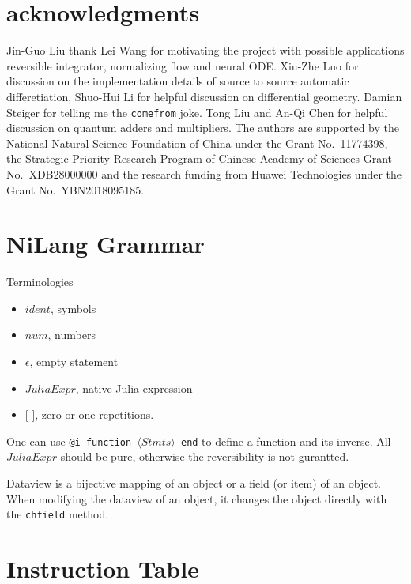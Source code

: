 \documentclass[aps,twocolumn,longbibliography,english,superscriptaddress]{revtex4-1}
\newcommand{\<}{\langle}
\renewcommand{\>}{\rangle}
\theoremstyle{definition}\newtheorem{definition}{\textit{Definition}}
\begin{document}
\section{acknowledgments}
Jin-Guo Liu thank Lei Wang for motivating the project with possible applications reversible integrator, normalizing flow and neural ODE.
Xiu-Zhe Luo for discussion on the implementation details of source to source automatic differetiation,
Shuo-Hui Li for helpful discussion on differential geometry.
Damian Steiger for telling me the \texttt{comefrom} joke.
Tong Liu and An-Qi Chen for helpful discussion on quantum adders and multipliers.
The authors are supported by the National Natural Science Foundation of China under the Grant No.~11774398, the Strategic Priority Research Program of Chinese Academy of Sciences Grant No.~XDB28000000 and the research funding from Huawei Technologies under the Grant No.~YBN2018095185.




\pagebreak
\appendix

\section{NiLang Grammar}\label{app:grammar}

Terminologies
\begin{itemize}
    \item $ident$, symbols
    \item $num$, numbers
    \item $\epsilon$, empty statement
    \item $JuliaExpr$, native Julia expression
    \item $[$ $]$,  zero or one repetitions.
\end{itemize}

\begin{minipage}{0.3\textwidth}
    \small

\end{minipage}

One can use \texttt{@i function $\<Stmts\>$ end} to define a function and its inverse. All $JuliaExpr$ should be pure, otherwise the reversibility is not gurantted.

Dataview is a bijective mapping of an object or a field (or item) of an object.
When modifying the dataview of an object, it changes the object directly with the \texttt{chfield} method.

\section{Instruction Table}\label{app:instr}
\end{document}
